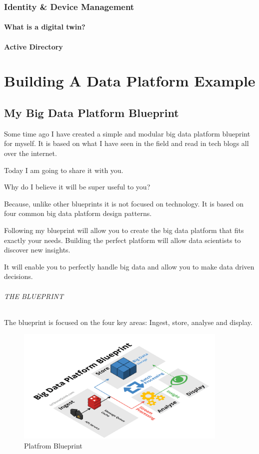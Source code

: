\documentclass[12pt, numbers=noenddot]{scrreprt} %
\begin{document}
\section{Identity \& Device Management}

\subsection{What is a digital twin?}
\subsection{Active Directory}




\part{Building A Data Platform Example}

\chapter {My Big Data Platform Blueprint}
Some time ago I have created a simple and modular big data platform blueprint for myself. It is based on what I have seen in the field and read in tech blogs all over the internet.

Today I am going to share it with you.

Why do I believe it will be super useful to you?

Because, unlike other blueprints it is not focused on technology. It is based on four common big data platform design patterns.

Following my blueprint will allow you to create the big data platform that fits exactly your needs. Building the perfect platform will allow data scientists to discover new insights.

It will enable you to perfectly handle big data and allow you to make data driven decisions.

\paragraph{THE BLUEPRINT}
The blueprint is focused on the four key areas: Ingest, store, analyse and display.

\begin{figure}[htbp]
  \centering
     \includegraphics[width=0.9\textwidth]{images/Big-Data-Platform-Blueprint-Title-Original.png}
  \caption{Platfrom Blueprint}
  \label{fig:Bild1}
\end{figure}
\end{document}
